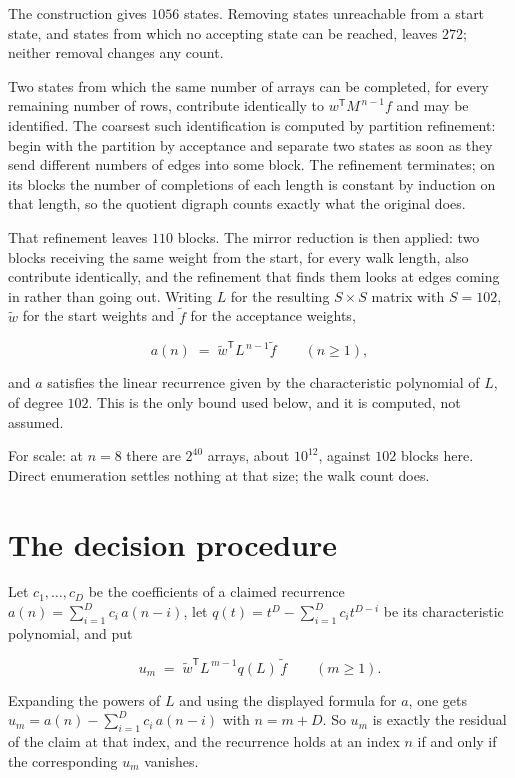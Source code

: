 \documentclass[11pt]{article}
\theoremstyle{definition}
\begin{document}
The construction gives $1056$ states. Removing states unreachable from a start state, and states from which no accepting state can be reached, leaves $272$; neither removal changes any count.

Two states from which the same number of arrays can be completed, for every remaining number of rows, contribute identically to $w^{\mathsf T}M^{\,n-1}f$ and may be identified. The coarsest such identification is computed by partition refinement: begin with the partition by acceptance and separate two states as soon as they send different numbers of edges into some block. The refinement terminates; on its blocks the number of completions of each length is constant by induction on that length, so the quotient digraph counts exactly what the original does.

That refinement leaves $110$ blocks. The mirror reduction is then applied: two blocks receiving the same weight from the start, for every walk length, also contribute identically, and the refinement that finds them looks at edges coming in rather than going out. Writing $L$ for the resulting $S \times S$ matrix with $S = 102$, $\tilde w$ for the start weights and $\tilde f$ for the acceptance weights,

\[a(n) \;=\; \tilde w^{\mathsf T} L^{\,n-1} \tilde f \qquad (n \ge 1),\]

and $a$ satisfies the linear recurrence given by the characteristic polynomial of $L$, of degree $102$. This is the only bound used below, and it is computed, not assumed.

For scale: at $n = 8$ there are $2^{40}$ arrays, about $10^{12}$, against $102$ blocks here. Direct enumeration settles nothing at that size; the walk count does.

\section{The decision procedure}

Let $c_1,\dots,c_D$ be the coefficients of a claimed recurrence $a(n) = \sum_{i=1}^{D} c_i\,a(n-i)$, let $q(t) = t^{D} - \sum_{i=1}^{D} c_i t^{D-i}$ be its characteristic polynomial, and put

\[u_m \;=\; \tilde w^{\mathsf T} L^{\,m-1} q(L)\,\tilde f \qquad (m \ge 1).\]

Expanding the powers of $L$ and using the displayed formula for $a$, one gets $u_m = a(n) - \sum_{i=1}^{D} c_i\,a(n-i)$ with $n = m + D$. So $u_m$ is exactly the residual of the claim at that index, and the recurrence holds at an index $n$ if and only if the corresponding $u_m$ vanishes.
\end{document}
